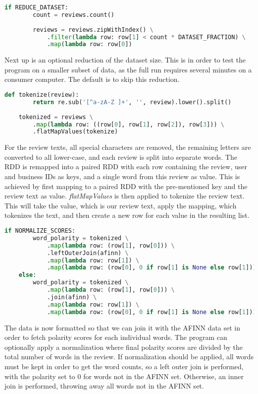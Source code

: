 \documentclass[a4paper]{article}
\begin{document}
\begin{lstlisting}[language=python]
    if REDUCE_DATASET:
        count = reviews.count()
        
        reviews = reviews.zipWithIndex() \
            .filter(lambda row: row[1] < count * DATASET_FRACTION) \
            .map(lambda row: row[0])
\end{lstlisting}

Next up is an optional reduction of the dataset size. This is in order to test the program on a smaller subset of data, as the full run requires several minutes on a consumer computer. The default is to skip this reduction.

\begin{lstlisting}[language=python]
    def tokenize(review):
        return re.sub('[^a-zA-Z ]+', '', review).lower().split()
    
    tokenized = reviews \
        .map(lambda row: ((row[0], row[1], row[2]), row[3])) \
        .flatMapValues(tokenize)
\end{lstlisting}

For the review texts, all special characters are removed, the remaining letters are converted to all lower-case, and each review is split into separate words. The RDD is remapped into a paired RDD with each row containing the review, user and business IDs as keys, and a single word from this review as value. This is achieved by first mapping to a paired RDD with the pre-mentioned key and the review text as value. \emph{flatMapValues} is then applied to tokenize the review text. This will take the value, which is our review text, apply the mapping, which tokenizes the text, and then create a new row for each value in the resulting list.


\begin{lstlisting}[language=python]
    if NORMALIZE_SCORES:
        word_polarity = tokenized \
            .map(lambda row: (row[1], row[0])) \
            .leftOuterJoin(afinn) \
            .map(lambda row: row[1]) \
            .map(lambda row: (row[0], 0 if row[1] is None else row[1]))
    else:
        word_polarity = tokenized \
            .map(lambda row: (row[1], row[0])) \
            .join(afinn) \
            .map(lambda row: row[1]) \
            .map(lambda row: (row[0], 0 if row[1] is None else row[1]))
\end{lstlisting}

The data is now formatted so that we can join it with the AFINN data set in order to fetch polarity scores for each individual words. The program can optionally apply a normalization where final polarity scores are divided by the total number of words in the review. If normalization should be applied, all words must be kept in order to get the word counts, so a left outer join is performed, with the polarity set to 0 for words not in the AFINN set. Otherwise, an inner join is performed, throwing away all words not in the AFINN set.
\end{document}
